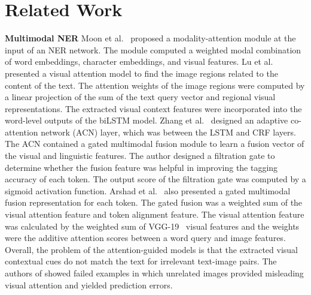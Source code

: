 \documentclass[letterpaper]{article} \usepackage{aaai21}  \usepackage{times}  \usepackage{helvet} \usepackage{courier}  \usepackage[hyphens]{url}  \usepackage{graphicx} \urlstyle{rm} \def\UrlFont{\rm}  \usepackage{natbib}  \usepackage{caption} \frenchspacing  \setlength{\pdfpagewidth}{8.5in}  \setlength{\pdfpageheight}{11in}
\begin{document}
\section{Related Work}

\smallskip
\noindent
\textbf{Multimodal NER} 
Moon et al.~ proposed a modality-attention module at the input of an NER network.
The module computed a weighted modal combination of word embeddings, character embeddings, and visual features.
Lu et al.~ presented a visual attention model to find the image regions related to the content of the text. 
The attention weights of the image regions were computed by a linear projection of the sum of the text query vector and  regional visual representations. 
The extracted visual context features were incorporated into the word-level outputs of the biLSTM model.
Zhang et al.~ designed an adaptive co-attention network (ACN) layer, which was between the LSTM and CRF layers.
The ACN contained a gated multimodal fusion module to learn a fusion vector of the visual and linguistic features.
The author designed a filtration gate to determine whether the fusion feature was helpful in improving the tagging accuracy of each token.
The output score of the filtration gate was computed by a sigmoid activation function.
Arshad et al.~ also presented  a gated multimodal fusion representation for each token.
The gated fusion was a weighted sum of the visual attention feature and token alignment feature.
The visual attention feature was calculated by the weighted sum of VGG-19~\cite{simonyan2014very} visual features and the weights were the additive attention scores between a word query and image features.
Overall, the problem of the attention-guided models is that the extracted visual contextual cues do not match the text for irrelevant text-image pairs.
The authors of \cite{lu2018visual,arshad2019aiding} showed failed examples in which unrelated images provided  misleading visual attention and yielded prediction errors.
\end{document}
